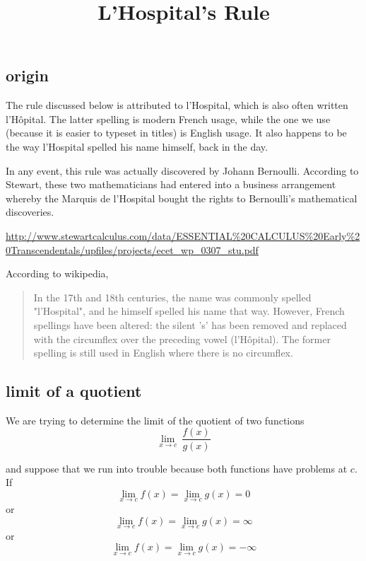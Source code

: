 \documentclass[11pt, oneside]{article}
\title{L'Hospital's Rule}
\date{}
\begin{document}
\maketitle
\Large


\label{sec:Hospital}

\subsection*{origin}
The rule discussed below is attributed to l'Hospital, which is also often written l'H\^{o}pital.  The latter spelling is modern French usage, while the one we use (because it is easier to typeset in titles) is English usage.  It also happens to be the way l'Hospital spelled his name himself, back in the day.

In any event, this rule was actually discovered by Johann Bernoulli.  According to Stewart, these two mathematicians had entered into a business arrangement whereby the Marquis de l'Hospital bought the rights to Bernoulli's mathematical discoveries.

\url{http://www.stewartcalculus.com/data/ESSENTIAL%20CALCULUS%20Early%20Transcendentals/upfiles/projects/ecet_wp_0307_stu.pdf}

According to wikipedia,

\begin{quote}
In the 17th and 18th centuries, the name was commonly spelled "l'Hospital", and he himself spelled his name that way. However, French spellings have been altered: the silent 's' has been removed and replaced with the circumflex over the preceding vowel (l'H\^{o}pital). The former spelling is still used in English where there is no circumflex.\end{quote}

\subsection*{limit of a quotient}

We are trying to determine the limit of the quotient of two functions
\[ \lim_{x \rightarrow c} \ \frac{f(x)}{g(x)} \]

and suppose that we run into trouble because both functions have problems at $c$.  If
\[ \lim_{x \rightarrow c} f(x) = \lim_{x \rightarrow c} g(x) = 0 \]
or 
\[ \lim_{x \rightarrow c} f(x) = \lim_{x \rightarrow c} g(x) = \infty \]
or
\[ \lim_{x \rightarrow c} f(x) = \lim_{x \rightarrow c} g(x) = -\infty \]
\end{document}
